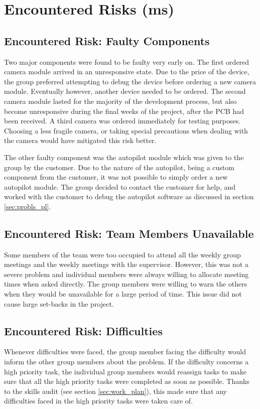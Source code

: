 
\section{Encountered Risks (ms)}
\label{encountered risks}

\subsection{Encountered Risk: Faulty Components}
Two major components were found to be faulty very early on. 
The first ordered camera module  
arrived in an unresponsive state. 
Due to the price of the device, 
the group preferred attempting to debug the device before 
ordering a new camera module. 
Eventually however, another device needed to be ordered. 
The second camera module lasted for the majority of 
the development process, but also 
become unresponsive during the final weeks of the project,
after the PCB had been received. 
A third camera was ordered immediately for testing purposes.
Choosing a less fragile camera, or taking special precautions
when dealing with the camera would have mitigated this risk better.

The other faulty component was the autopilot module which 
was given to the group by the customer. 
Due to the nature of the autopilot, being a custom component 
from the customer, it was not possible to simply 
order a new autopilot module. 
The group decided to contact the customer for help, and 
worked with the customer to debug the autopilot software 
as discussed in section \ref{sec:probls_pl}.

\subsection{Encountered Risk: Team Members Unavailable}
Some members of the team were too occupied to attend 
all the weekly group meetings and 
the weekly meetings with the supervisor. 
However, this was not a severe problem and individual 
members were always willing to allocate 
meeting times when asked directly. 
The group members were willing to warn the others 
when they would be unavailable for a large period of time. 
This issue did not cause large set-backs in the project.

\subsection{Encountered Risk: Difficulties}
Whenever difficulties were faced, the group member 
facing the difficulty would inform the other 
group members about the problem. 
If the difficulty concerns a high priority task, 
the individual group members would reassign 
tasks to make sure that all the high priority 
tasks were completed as soon as possible. 
Thanks to the skills audit (see section \ref{sec:work_plan}), this made sure that 
any difficulties faced in the high priority 
tasks were taken care of. 

